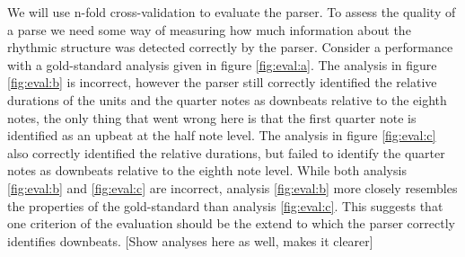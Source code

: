 We will use n-fold cross-validation to evaluate the parser. To assess the quality of a parse we need some way of measuring how much information about the rhythmic structure was detected correctly by the parser.  Consider a performance with a gold-standard analysis given in figure \ref{fig:eval:a}. The analysis in figure \ref{fig:eval:b} is incorrect, however the parser still correctly identified the relative durations of the units and the quarter notes as downbeats relative to the eighth notes, the only thing that went wrong here is that the first quarter note is identified as an upbeat at the half note level. The analysis in figure \ref{fig:eval:c} also correctly identified the relative durations, but failed to identify the quarter notes as downbeats relative to the eighth note level. While both analysis \ref{fig:eval:b} and \ref{fig:eval:c} are incorrect, analysis \ref{fig:eval:b} more closely resembles the properties of the gold-standard than analysis \ref{fig:eval:c}. This suggests that one criterion of the evaluation should be the extend to which the parser correctly identifies downbeats.  [Show analyses here as well, makes it clearer]
